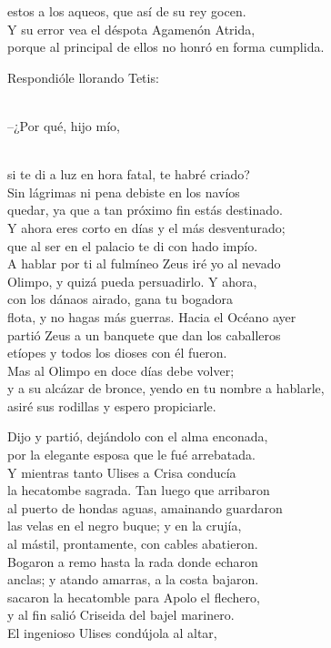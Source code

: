 \documentclass[11pt,twoside]{article}
\newcommand{\dlgo}[2]{\sbox{\dbox}{#1}\parbox[t]{\linewidth}{#1\strut\\[0pt]\hspace*{\wd\dbox}\hspace{\fontdimen2\font}#2\strut}}
\begin{document}
estos a los aqueos, que así de su rey gocen.\\
Y su error vea el déspota Agamenón Atrida,\\
porque al principal de ellos no honró en forma cumplida.\par
\dlgo{Respondióle llorando Tetis:}{--¿Por qué, hijo mío,}\\
si te di a luz en hora fatal, te habré criado?\\
Sin lágrimas ni pena debiste en los navíos\\
quedar, ya que a tan próximo fin estás destinado.\\
Y ahora eres corto en días y el más desventurado;\\
que al ser en el palacio te di con hado impío.\\
A hablar por ti al fulmíneo Zeus iré yo al nevado\\
Olimpo, y quizá pueda persuadirlo. Y ahora,\\
con los dánaos airado, gana tu bogadora\\
flota, y no hagas más guerras. Hacia el Océano ayer\\
partió Zeus a un banquete que dan los caballeros\\
etíopes y todos los dioses con él fueron.\\
Mas al Olimpo en doce días debe volver;\\
y a su alcázar de bronce, yendo en tu nombre a hablarle,\\
asiré sus rodillas y espero propiciarle.\par
Dijo y partió, dejándolo con el alma enconada,\\
por la elegante esposa que le fué arrebatada.\\
Y mientras tanto Ulises a Crisa conducía\\
la hecatombe sagrada. Tan luego que arribaron\\
al puerto de hondas aguas, amainando guardaron\\
las velas en el negro buque; y en la crujía,\\
al mástil, prontamente, con cables abatieron.\\
Bogaron a remo hasta la rada donde echaron\\
anclas; y atando amarras, a la costa bajaron.\\
sacaron la hecatomble para Apolo el flechero,\\
y al fin salió Criseida del bajel marinero.\\
El ingenioso Ulises condújola al altar,\\
\end{document}
